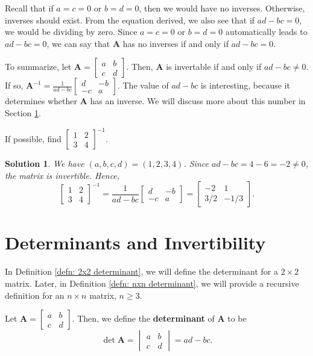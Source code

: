 \documentclass[]{book}
\newcommand{\inv}[1]{\ensuremath{{#1}^{-1}}}
\newcommand{\invm}[1]{\ensuremath{\inv{\mat{#1}}}}
\newcommand{\mat}[1]{\ensuremath{\mathbf{#1}}}
\newtheorem*{solution}{Solution}
\begin{document}
Recall that if $a=c=0$ or $b=d=0$, then we would have no inverses. Otherwise, inverses should exist. From the equation derived, we also see that if $ad-bc = 0$, we would be dividing by zero. Since $a=c=0$ or $b=d=0$ automatically leads to $ad-bc=0$, we can say that $\mat{A}$ has no inverses if and only if $ad-bc = 0$. 

To summarize, let $\mat{A} = \begin{bmatrix}a&b\\c&d\end{bmatrix}$. Then, $\mat{A}$ is invertable if and only if $ad - bc \neq 0$. If so, $\invm{A} = \frac{1}{ad-bc} \begin{bmatrix}d & -b \\ -c & a \end{bmatrix}$. The value of $ad - bc$ is interesting, because it determines whether $\mat{A}$ has an inverse. We will discuss more about this number in Section \ref{section: determinants and invertibility}.

\begin{example}
    If possible, find $\begin{bmatrix} 1 & 2 \\ 3 & 4 \end{bmatrix}^{-1}$.
\begin{solution}
    We have $(a,b,c,d) = (1,2,3,4)$. Since $ad-bc = 4-6 = -2 \neq 0$, the matrix is invertible. Hence,
    \[\begin{bmatrix} 1 & 2 \\ 3 & 4 \end{bmatrix}^{-1} = \frac{1}{ad-bc} \begin{bmatrix}d & -b \\ -c & a \end{bmatrix} = \begin{bmatrix}-2 & 1 \\ 3/2 & -1/3\end{bmatrix}.\]\hfill \qedsymbol
\end{solution}
\end{example}

\section{Determinants and Invertibility}
\label{section: determinants and invertibility}

In Definition \ref{defn: 2x2 determinant}, we will define the determinant for a $2 \times 2$ matrix. Later, in Definition \ref{defn: nxn determinant}, we will provide a recursive definition for an $n \times n$ matrix, $n \geq 3$.
\begin{definition}
    \label{defn: 2x2 determinant}
    Let $\mat{A} = \begin{bmatrix}a & b \\ c & d \end{bmatrix}$. Then, we define the \textbf{determinant} of $\mat{A}$ to be \[\det\mat{A} = \begin{vmatrix}a & b \\ c & d\end{vmatrix} = ad-bc.\]
\end{definition}
\end{document}
